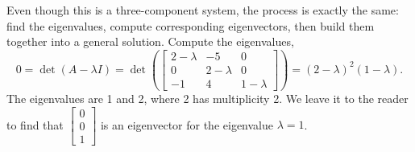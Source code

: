 \begin{exampleSol}
Even though this is a three-component system, the process is exactly the same: find the eigenvalues, compute corresponding eigenvectors, then build them together into a general solution. Compute the eigenvalues,
\begin{equation*}
0 =
\det(A-\lambda I) = 
\det\left(
\begin{bmatrix}
2-\lambda & -5 & 0 \\
0 & 2-\lambda & 0 \\
-1 & 4 & 1-\lambda
\end{bmatrix}
\right)
= (2-\lambda)^2(1-\lambda) .
\end{equation*}
The eigenvalues are 1 and 2, where 2 has multiplicity 2.
We leave it to the reader to find that
$\left[ \begin{smallmatrix} 0 \\ 0 \\ 1 \end{smallmatrix} \right]$
is an eigenvector
for the eigenvalue $\lambda = 1$.


\end{exampleSol}
